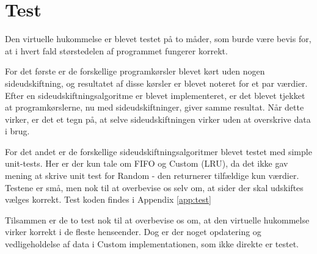 \section{Test}
Den virtuelle hukommelse er blevet testet på to måder, som burde være bevis for, at i hvert fald størstedelen af programmet fungerer korrekt.

For det første er de forskellige programkørsler blevet kørt uden nogen sideudskiftning, og resultatet af disse kørsler er blevet noteret for et par værdier. Efter en sideudskiftningsalgoritme er blevet implementeret, er det blevet tjekket at programkørslerne, nu med sideudskiftninger, giver samme resultat. Når dette virker, er det et tegn på, at selve sideudskiftningen virker uden at overskrive data i brug.

For det andet er de forskellige sideudskiftningsalgoritmer blevet testet med simple unit-tests. Her er der kun tale om FIFO og Custom (LRU), da det ikke gav mening at skrive unit test for Random - den returnerer tilfældige kun værdier. Testene er små, men nok til at overbevise os selv om, at sider der skal udskiftes vælges korrekt. Test koden findes i Appendix \ref{app:test}

Tilsammen er de to test nok til at overbevise os om, at den virtuelle hukommelse virker korrekt i de fleste henseender. Dog er der noget opdatering og vedligeholdelse af data i Custom implementationen, som ikke direkte er testet.